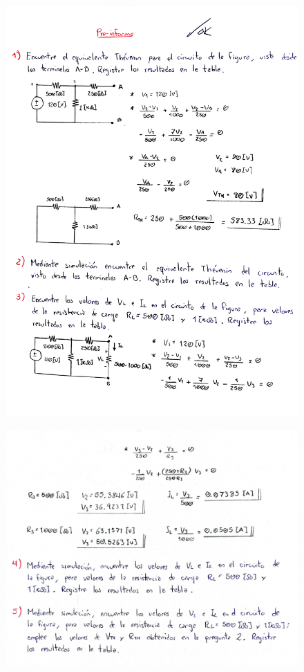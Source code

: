 \documentclass[letter,11pt]{article}
\begin{document}
\begin{figure}[!h]
\centering
\includegraphics[scale=0.168]{resources/preinforme1.eps}
\end{figure}

\begin{figure}[!h]
\centering
\includegraphics[scale=0.168]{resources/preinforme2.eps}
\end{figure}
\end{document}
